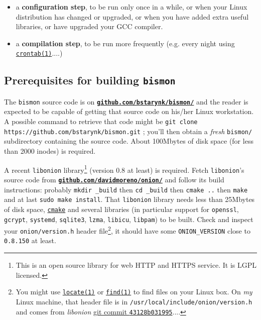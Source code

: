 \begin{appendices}
\begin{itemize}

\item a \textbf{configuration step}, to be run only once in a while,
  or when your Linux distribution has changed or upgraded, or when you
  have added extra useful libraries, or have upgraded your GCC
  compiler.

\item a \textbf{compilation step}, to be run more frequently
  (e.g. every night using
  \href{https://man7.org/linux/man-pages/man1/crontab.1.html}{\texttt{crontab(1)}}....)

\end{itemize}

\medskip

\subsection{Prerequisites for building \texttt{bismon}}
\label{subsec:prereq-bismon}

The \texttt{bismon} source code is on
\href{https://github.com/bstarynk/bismon/}{\texttt{\textbf{github.com/bstarynk/bismon/}}}
and the reader is expected to be capable of getting that source code
on his/her Linux workstation. A possible command to retrieve that code
might be \texttt{git clone https://github.com/bstarynk/bismon.git} ;
you'll then obtain a \emph{fresh} \texttt{bismon/} subdirectory
containing the source code. About 100Mbytes of disk space (for less
than 2000 inodes) is required.

A recent \texttt{libonion} library\footnote{This is an open source
  library for web HTTP and HTTPS service. It is LGPL licensed.}
(version 0.8 at least) is required. Fetch \texttt{libonion}'s source
code from
\href{https://github.com/davidmoreno/onion}{\texttt{\textbf{github.com/davidmoreno/onion/}}}
and follow its build instructions: probably \texttt{mkdir \_build} then
\texttt{cd \_build} then \texttt{cmake ..} then \texttt{make} and at
last \texttt{sudo make install}. That \texttt{libonion} library needs
less than 25Mbytes of disk space,
\href{https://cmake.org}{\texttt{cmake}} and several libraries (in
particular support for \texttt{openssl}, \texttt{gcrypt},
\texttt{systemd}, \texttt{sqlite3}, \texttt{lzma}, \texttt{libicu},
\texttt{libpam}) to be built. Check and inspect your
\texttt{onion/version.h} header file\footnote{You might use
  \href{https://man7.org/linux/man-pages/man1/locate.1.html}{\texttt{locate(1)}}
  or
  \href{https://man7.org/linux/man-pages/man1/find.1.html}{\texttt{find(1)}}
  to find files on your Linux box. On \emph{my} Linux machine, that
  header file is in \texttt{/usr/local/include/onion/version.h} and
  comes from \emph{libonion}
  \href{https://github.com/davidmoreno/onion/commit/43128b03199518d4878074c311ff71ff0018aea8}{git
    commit \texttt{43128b031995}}....}, it should have some
\texttt{ONION\_VERSION} close to \texttt{0.8.150} at least.


\end{appendices}

